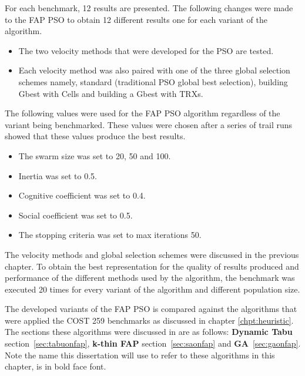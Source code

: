 For each benchmark, 12 results are presented. The following changes were made to the FAP PSO to obtain 12 different results one for each variant of the algorithm.
\begin{itemize}
\item The two velocity methods that were developed for the PSO are tested.
\item Each velocity method was also paired with one of the three global selection schemes namely, standard (traditional PSO global best selection), building Gbest with Cells and building a Gbest with TRXs.
\end{itemize}
The following values were used for the FAP PSO algorithm regardless of the variant being benchmarked. These values were chosen after a series of trail runs showed that these values produce the best results.
\begin{itemize}
\item The swarm size was set to 20, 50 and 100.
\item Inertia was set to 0.5.
\item Cognitive coefficient was set to 0.4.
\item Social coefficient was set to 0.5.
\item The stopping criteria was set to max iterations 50.
\end{itemize}
The velocity methods and global selection schemes were discussed in the previous chapter. To obtain the best representation for the quality of results produced and performance of the different methods used by the algorithm, the benchmark was executed 20 times for every variant of the algorithm and different population size. 

The developed variants of the FAP PSO is compared against the algorithms that were applied the \gls{COST} 259 benchmarks as discussed in chapter \ref{chpt:heuristic}. The sections these algorithms were discussed in are as follows: \textbf{Dynamic Tabu} section~\ref{sec:tabuonfap}, \textbf{k-thin FAP} section~\ref{sec:saonfap} and \textbf{GA}~\ref{sec:gaonfap}. Note the name this dissertation will use to refer to these algorithms in this chapter, is in bold face font.

